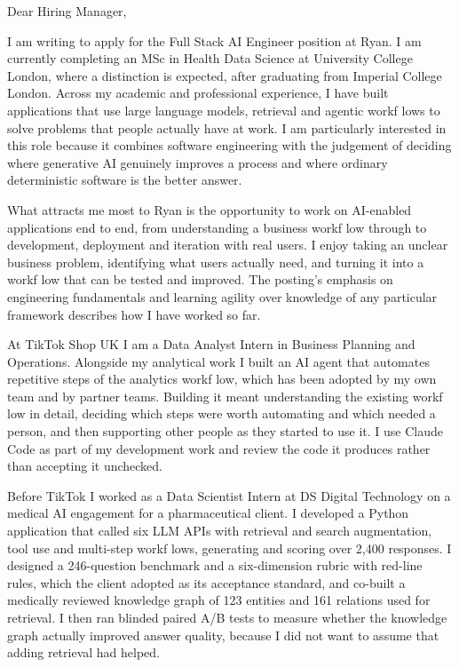 \documentclass[letterpaper,11pt]{article}
\begin{document}
Dear Hiring Manager,

I am writing to apply for the Full Stack AI Engineer position at Ryan. I am currently completing an MSc in Health Data Science at University College London, where a distinction is expected, after graduating from Imperial College London. Across my academic and professional experience, I have built applications that use large language models, retrieval and agentic workf\kern0pt lows to solve problems that people actually have at work. I am particularly interested in this role because it combines software engineering with the judgement of deciding where generative AI genuinely improves a process and where ordinary deterministic software is the better answer.

What attracts me most to Ryan is the opportunity to work on AI-enabled applications end to end, from understanding a business workf\kern0pt low through to development, deployment and iteration with real users. I enjoy taking an unclear business problem, identifying what users actually need, and turning it into a workf\kern0pt low that can be tested and improved. The posting's emphasis on engineering fundamentals and learning agility over knowledge of any particular framework describes how I have worked so far.

At TikTok Shop UK I am a Data Analyst Intern in Business Planning and Operations. Alongside my analytical work I built an AI agent that automates repetitive steps of the analytics workf\kern0pt low, which has been adopted by my own team and by partner teams. Building it meant understanding the existing workf\kern0pt low in detail, deciding which steps were worth automating and which needed a person, and then supporting other people as they started to use it. I use Claude Code as part of my development work and review the code it produces rather than accepting it unchecked.

Before TikTok I worked as a Data Scientist Intern at DS Digital Technology on a medical AI engagement for a pharmaceutical client. I developed a Python application that called six LLM APIs with retrieval and search augmentation, tool use and multi-step workf\kern0pt lows, generating and scoring over 2,400 responses. I designed a 246-question benchmark and a six-dimension rubric with red-line rules, which the client adopted as its acceptance standard, and co-built a medically reviewed knowledge graph of 123 entities and 161 relations used for retrieval. I then ran blinded paired A/B tests to measure whether the knowledge graph actually improved answer quality, because I did not want to assume that adding retrieval had helped.
\end{document}
